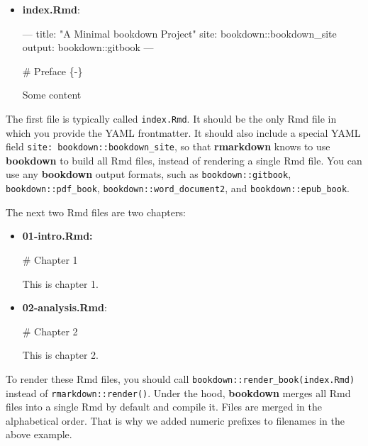 \documentclass[
  11pt,
]{krantz}
\newenvironment{Shaded}{\begin{snugshade}}{\end{snugshade}}
\newcommand{\FunctionTok}[1]{\textcolor[rgb]{0,0,0}{#1}}
\newcommand{\NormalTok}[1]{#1}
\begin{document}
\begin{itemize}
\item
  \textbf{index.Rmd}:

\begin{Shaded}
\begin{Highlighting}[]
\NormalTok{---}
\NormalTok{title: "A Minimal bookdown Project"}
\NormalTok{site: bookdown::bookdown_site}
\NormalTok{output: bookdown::gitbook}
\NormalTok{---}

\FunctionTok{# Preface \{-\}}

\NormalTok{Some content}
\end{Highlighting}
\end{Shaded}
\end{itemize}

The first file is typically called \texttt{index.Rmd}. It should be the only Rmd file in which you provide the YAML frontmatter. It should also include a special YAML field \texttt{site:\ bookdown::bookdown\_site}, so that \textbf{rmarkdown} knows to use \textbf{bookdown} to build all Rmd files, instead of rendering a single Rmd file. You can use any \textbf{bookdown} output formats, such as \texttt{bookdown::gitbook}, \texttt{bookdown::pdf\_book}, \texttt{bookdown::word\_document2}, and \texttt{bookdown::epub\_book}.

The next two Rmd files are two chapters:

\begin{itemize}
\item
  \textbf{01-intro.Rmd:}

\begin{Shaded}
\begin{Highlighting}[]
\FunctionTok{# Chapter 1}

\NormalTok{This is chapter 1.}
\end{Highlighting}
\end{Shaded}
\item
  \textbf{02-analysis.Rmd}:

\begin{Shaded}
\begin{Highlighting}[]
\FunctionTok{# Chapter 2}

\NormalTok{This is chapter 2.}
\end{Highlighting}
\end{Shaded}
\end{itemize}

To render these Rmd files, you should call \texttt{bookdown::render\_book(\textquotesingle{}index.Rmd\textquotesingle{})} instead of \texttt{rmarkdown::render()}. Under the hood, \textbf{bookdown} merges all Rmd files into a single Rmd by default and compile it. Files are merged in the alphabetical order. That is why we added numeric prefixes to filenames in the above example.
\end{document}
